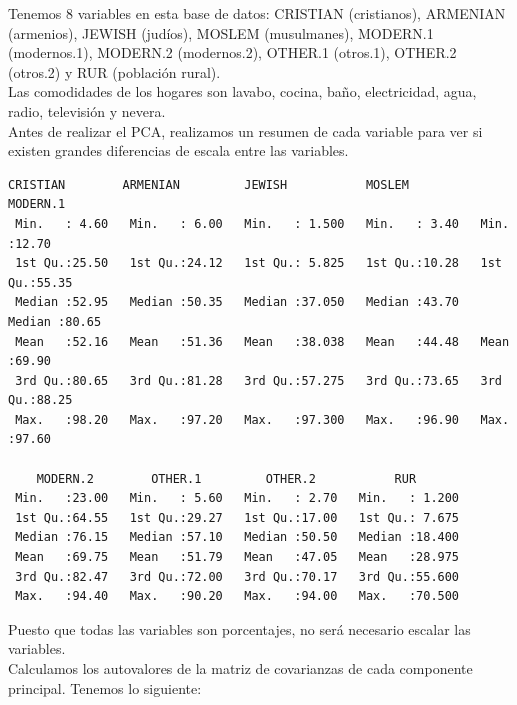 \documentclass[12pt,a4paper,twoside,openright,titlepage,final]{article}
\begin{document}
Tenemos 8 variables en esta base de datos: CRISTIAN (cristianos), ARMENIAN (armenios), JEWISH (judíos), MOSLEM (musulmanes), MODERN.1 (modernos.1), MODERN.2 (modernos.2), OTHER.1 (otros.1), OTHER.2 (otros.2) y RUR (población rural).\\

Las comodidades de los hogares son lavabo, cocina, baño, electricidad, agua, radio, televisión y nevera.\\

Antes de realizar el PCA, realizamos un resumen de cada variable para ver si existen grandes diferencias de escala entre las variables.

\begin{Verbatim}[fontsize=\scriptsize]
   CRISTIAN        ARMENIAN         JEWISH           MOSLEM         MODERN.1       
 Min.   : 4.60   Min.   : 6.00   Min.   : 1.500   Min.   : 3.40   Min.   :12.70  
 1st Qu.:25.50   1st Qu.:24.12   1st Qu.: 5.825   1st Qu.:10.28   1st Qu.:55.35   
 Median :52.95   Median :50.35   Median :37.050   Median :43.70   Median :80.65   
 Mean   :52.16   Mean   :51.36   Mean   :38.038   Mean   :44.48   Mean   :69.90   
 3rd Qu.:80.65   3rd Qu.:81.28   3rd Qu.:57.275   3rd Qu.:73.65   3rd Qu.:88.25   
 Max.   :98.20   Max.   :97.20   Max.   :97.300   Max.   :96.90   Max.   :97.60  
 
    MODERN.2        OTHER.1         OTHER.2           RUR        
 Min.   :23.00   Min.   : 5.60   Min.   : 2.70   Min.   : 1.200  
 1st Qu.:64.55   1st Qu.:29.27   1st Qu.:17.00   1st Qu.: 7.675  
 Median :76.15   Median :57.10   Median :50.50   Median :18.400  
 Mean   :69.75   Mean   :51.79   Mean   :47.05   Mean   :28.975  
 3rd Qu.:82.47   3rd Qu.:72.00   3rd Qu.:70.17   3rd Qu.:55.600  
 Max.   :94.40   Max.   :90.20   Max.   :94.00   Max.   :70.500  
\end{Verbatim}

Puesto que todas las variables son porcentajes, no será necesario escalar las variables.\\

Calculamos los autovalores de la matriz de covarianzas de cada componente principal. Tenemos lo siguiente:
\end{document}
